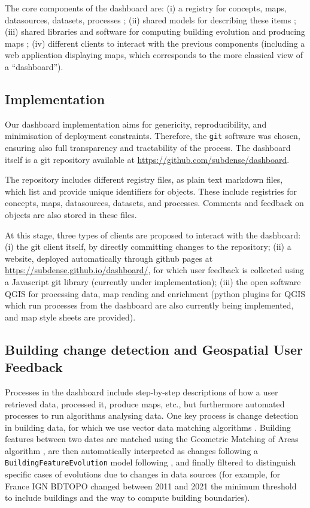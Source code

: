 \documentclass[agile, final]{copernicus-agile}
\begin{document}
The core components of the dashboard are: (i) a registry for concepts, maps,  datasources, datasets, processes ; (ii) shared models for describing these items  ; (iii) shared libraries and software for computing building evolution and producing maps ; (iv) different clients to interact with the previous components (including a web application displaying maps, which corresponds to the more classical view of a ``dashboard'').

\subsection{Implementation}


Our dashboard implementation aims for genericity, reproducibility, and minimisation of deployment constraints. Therefore, the \texttt{git} software was chosen, ensuring also full transparency and tractability of the process. The dashboard itself is a git repository available at \url{https://github.com/subdense/dashboard}.

The repository includes different registry files, as plain text markdown files, which list and provide unique identifiers for objects. These include registries for concepts, maps, datasources, datasets, and processes. Comments and feedback on objects are also stored in these files.

At this stage, three types of clients are proposed to interact with the dashboard: (i) the git client itself, by directly committing changes to the repository; (ii) a website, deployed automatically through github pages at \url{https://subdense.github.io/dashboard/}, for which user feedback is collected using a Javascript git library (currently under implementation); (iii) the open software QGIS for processing data, map reading and enrichment (python plugins for QGIS which run processes from the dashboard are also currently being implemented, and map style sheets are provided).


\subsection{Building change detection and Geospatial User Feedback}


Processes in the dashboard include step-by-step descriptions of how a user retrieved data, processed it, produce maps, etc., but furthermore automated processes to run algorithms analysing data. One key process is change detection in building data, for which we use vector data matching algorithms \citep{olteanu2015knowledge}. Building features between two dates are matched using the Geometric Matching of Areas algorithm \citep{harvey1998geometric}, are then automatically interpreted as changes following a \texttt{BuildingFeatureEvolution} model following \cite{claramunt1997qualitative}, and finally filtered to distinguish specific cases of evolutions due to changes in data sources (for example, for France IGN BDTOPO changed between 2011 and 2021 the minimum threshold to include buildings and the way to compute building boundaries).
\end{document}
